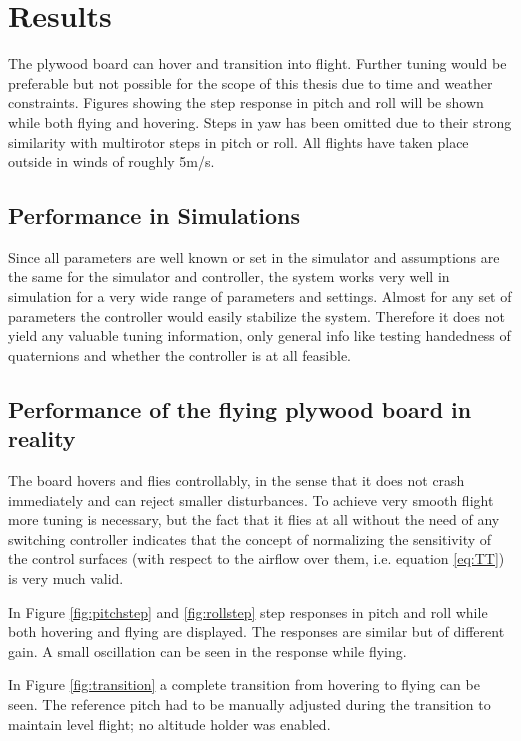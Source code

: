 \documentclass{article}
\begin{document}
\section{Results}

The plywood board can hover and transition into flight.
Further tuning would be preferable but not possible for the scope of this thesis due to time and weather constraints.
Figures showing the step response in pitch and roll will be shown while both flying and hovering.
Steps in yaw has been omitted due to their strong similarity with multirotor steps in pitch or roll.
All flights have taken place outside in winds of roughly 5m/s.

\subsection{Performance in Simulations}
Since all parameters are well known or set in the simulator and assumptions are the same for the simulator and controller, the system works very well in simulation for a very wide range of parameters and settings. Almost for any set of parameters the controller would easily stabilize the system.
Therefore it does not yield any valuable tuning information, only general info like testing handedness of quaternions and whether the controller is at all feasible.



\subsection{Performance of the flying plywood board in reality}
The board hovers and flies controllably, in the sense that it does not crash immediately and can reject smaller disturbances.
To achieve very smooth flight more tuning is necessary, but the fact that it flies at all without the need of any switching controller indicates that the concept of normalizing the sensitivity of the control surfaces (with respect to the airflow over them, i.e. equation \ref{eq:TT}) is very much valid.

In Figure \ref{fig:pitchstep} and \ref{fig:rollstep} step responses in pitch and roll while both hovering and flying are displayed.
The responses are similar but of different gain.
A small oscillation can be seen in the response while flying.

In Figure \ref{fig:transition} a complete transition from hovering to flying can be seen.
The reference pitch had to be manually adjusted during the transition to maintain level flight; no altitude holder was enabled.
\end{document}
